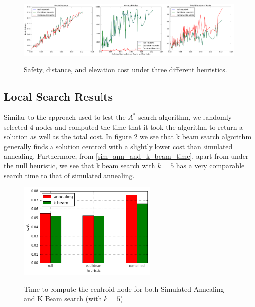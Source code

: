 \documentclass[11pt]{article}
\begin{document}
\begin{figure}[H]
\caption{Safety, distance, and elevation cost under three different heuristics.}
\includegraphics[width=1\textwidth]{../images/simple_distance_elevation_and_safety.png}
\label{simple_distance_elevation_and_safety}
\end{figure}

\subsection{Local Search Results}
Similar to the approach used to test the $A^{*}$ search algorithm, we randomly selected 4 nodes and computed the time that it took the algorithm to return a solution as well as the total cost. In figure \ref{sim_ann_and_k_beam_cost} we see that k beam search algorithm generally finds a solution centroid with a slightly lower cost than simulated annealing. Furthermore, from \ref{sim_ann_and_k_beam_time}, apart from under the null heuristic, we see that k beam search with $k=5$ has a very comparable search time to that of simulated annealing.

\begin{figure}[H]
\center
\caption{Time to compute the centroid node for both Simulated Annealing and K Beam search (with $k = 5$)}
\includegraphics[width=0.6\textwidth]{../images/k_beam_sim_annealing.png}
\label{sim_ann_and_k_beam_cost}
\end{figure}
\end{document}
